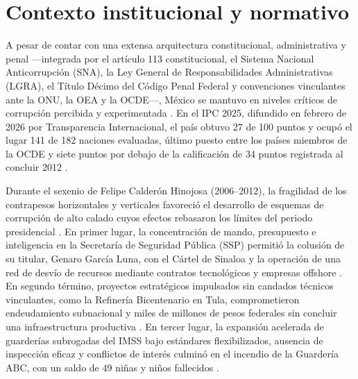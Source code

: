 

\section{Contexto institucional y normativo}

A pesar de contar con una extensa arquitectura constitucional, administrativa y penal ---integrada por el artículo 113 constitucional, el Sistema Nacional Anticorrupción (SNA), la Ley General de Responsabilidades Administrativas (LGRA), el Título Décimo del Código Penal Federal y convenciones vinculantes ante la ONU, la OEA y la OCDE---, México se mantuvo en niveles críticos de corrupción percibida y experimentada \citep{cpeum,lgra,casar2024,merino2024}. En el IPC 2025, difundido en febrero de 2026 por Transparencia Internacional, el país obtuvo 27 de 100 puntos y ocupó el lugar 141 de 182 naciones evaluadas, último puesto entre los países miembros de la OCDE y siete puntos por debajo de la calificación de 34 puntos registrada al concluir 2012 \citep{transparencia2026,mcci2026b}.

Durante el sexenio de Felipe Calderón Hinojosa (2006--2012), la fragilidad de los contrapesos horizontales y verticales favoreció el desarrollo de esquemas de corrupción de alto calado cuyos efectos rebasaron los límites del periodo presidencial \citep{astorga2015,lopezayllon2009}. En primer lugar, la concentración de mando, presupuesto e inteligencia en la Secretaría de Seguridad Pública (SSP) permitió la colusión de su titular, Genaro García Luna, con el Cártel de Sinaloa y la operación de una red de desvío de recursos mediante contratos tecnológicos y empresas offshore \citep{doj2024garcialuna,uif2025,uif2026}. En segundo término, proyectos estratégicos impulsados sin candados técnicos vinculantes, como la Refinería Bicentenario en Tula, comprometieron endeudamiento subnacional y miles de millones de pesos federales sin concluir una infraestructura productiva \citep{asf2015,asf2016}. En tercer lugar, la expansión acelerada de guarderías subrogadas del IMSS bajo estándares flexibilizados, ausencia de inspección eficaz y conflictos de interés culminó en el incendio de la Guardería ABC, con un saldo de 49 niñas y niños fallecidos \citep{cndh2009,scjn2010}.

